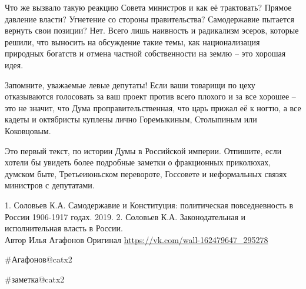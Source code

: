 Что же вызвало такую реакцию Совета министров и как её трактовать? Прямое давление власти? Угнетение со стороны правительства? Самодержавие пытается вернуть свои позиции? Нет. Всего лишь наивность и радикализм эсеров, которые решили, что выносить на обсуждение такие темы, как национализация природных богатств и отмена частной собственности на землю – это хорошая идея.

Запомните, уважаемые левые депутаты! Если ваши товарищи по цеху отказываются голосовать за ваш проект против всего плохого и за все хорошее – это не значит, что Дума проправительственная, что царь прижал её к ногтю, а все кадеты и октябристы куплены лично Горемыкиным, Столыпиным или Коковцовым.

Это первый текст, по истории Думы в Российской империи. Отпишите, если хотели бы увидеть более подробные заметки о фракционных приколюхах, думском быте, Третьеиюньском перевороте, Госсовете и неформальных связях министров с депутатами.


1. Соловьев К.А. Самодержавие и Конституция: политическая повседневность в России 1906-1917 годах. 2019.
2. Соловьев К.А. Законодательная и исполнительная власть в России.
\\

Автор Илья Агафонов Оригинал \url{https://vk.com/wall-162479647_295278}

\#Агафонов@catx2

\#заметка@catx2
